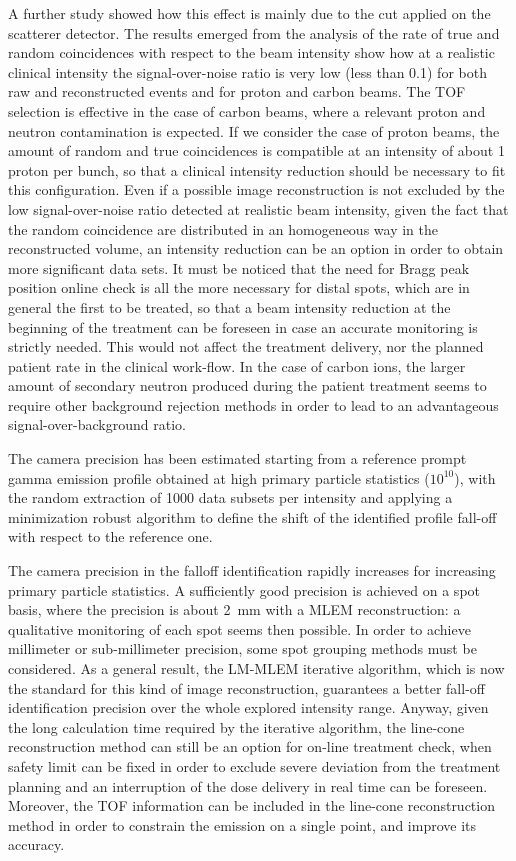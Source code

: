 A further study showed how this effect is mainly due to the cut applied on the scatterer detector. 
The results emerged from the analysis of the rate of true and random coincidences with respect to the beam intensity show how at a realistic clinical intensity the signal-over-noise ratio is very low (less than 0.1) for both raw and reconstructed events and for proton and carbon beams. The TOF selection is effective in the case of carbon beams, where a relevant proton and neutron contamination is expected. If we consider the case of proton beams, the amount of random and true coincidences is compatible at an intensity of about 1 proton per bunch, so that a clinical intensity reduction should be necessary to fit this configuration. Even if a possible image reconstruction is not excluded by the low signal-over-noise ratio detected at realistic beam intensity, given the fact that the random coincidence are distributed in an homogeneous way in the reconstructed volume, an intensity reduction can be an option in order to obtain more significant data sets. It must be noticed that the need for Bragg peak position online check is all the more necessary for distal spots, which are in general the first to be treated, so that a beam intensity reduction at the beginning of the treatment can be foreseen in case an accurate monitoring is strictly needed. This would not affect the treatment delivery, nor the planned patient rate in the clinical work-flow. 
In the case of carbon ions, the larger amount of secondary neutron produced during the patient treatment seems to require other background rejection methods in order to lead to an advantageous signal-over-background ratio.

The camera precision has been estimated starting from a reference prompt gamma emission profile obtained at high primary particle statistics ($10^{10}$), with the random extraction of 1000 data subsets per intensity and applying a minimization robust algorithm to define the shift of the identified profile fall-off with respect to the reference one.

The camera precision in the falloff identification rapidly increases for increasing primary particle statistics. A sufficiently good precision is achieved on a spot basis, where the precision is about 2~mm with a MLEM reconstruction: a qualitative monitoring of each spot seems then possible. In order to achieve millimeter or sub-millimeter precision, some spot grouping methods must be considered. As a general result, the LM-MLEM iterative algorithm, which is now the standard for this kind of image reconstruction,  guarantees a better fall-off identification precision over the whole explored intensity range. Anyway, given the long calculation time required by the iterative algorithm, the line-cone reconstruction method can still be an option for on-line treatment check, when safety limit can be fixed in order to exclude severe deviation from the treatment planning and an interruption of the dose delivery in real time can be foreseen. Moreover, the TOF information can be included in the line-cone reconstruction method in order to constrain the emission on a single point, and improve its accuracy.


